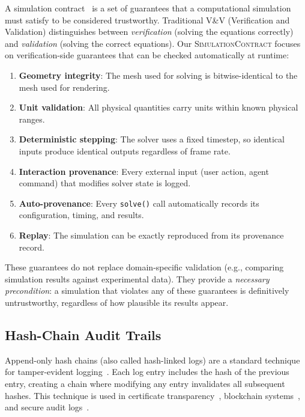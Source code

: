 \documentclass[letterpaper,twocolumn,10pt]{article}
\newcommand{\simcontract}{\textsc{SimulationContract}}
\begin{document}
A simulation contract~\cite{oberkampf2010verification,roache1998verification}
is a set of guarantees that a computational simulation must satisfy to be
considered trustworthy. Traditional V\&V (Verification and Validation)
distinguishes between \emph{verification} (solving the equations correctly)
and \emph{validation} (solving the correct equations). Our
\simcontract{} focuses on verification-side guarantees that can be
checked automatically at runtime:

\begin{enumerate}[leftmargin=*,topsep=2pt,itemsep=1pt]
  \item \textbf{Geometry integrity}: The mesh used for solving is
    bitwise-identical to the mesh used for rendering.
  \item \textbf{Unit validation}: All physical quantities carry units
    within known physical ranges.
  \item \textbf{Deterministic stepping}: The solver uses a fixed timestep,
    so identical inputs produce identical outputs regardless of frame rate.
  \item \textbf{Interaction provenance}: Every external input (user action,
    agent command) that modifies solver state is logged.
  \item \textbf{Auto-provenance}: Every \texttt{solve()} call automatically
    records its configuration, timing, and results.
  \item \textbf{Replay}: The simulation can be exactly reproduced from its
    provenance record.
\end{enumerate}

These guarantees do not replace domain-specific validation (e.g.,
comparing simulation results against experimental data). They provide
a \emph{necessary precondition}: a simulation that violates any of
these guarantees is definitively untrustworthy, regardless of how
plausible its results appear.

\subsection{Hash-Chain Audit Trails}

Append-only hash chains (also called hash-linked logs) are a standard
technique for tamper-evident logging~\cite{schneier1998cryptographic,
crosby2009efficient}. Each log entry includes the hash of the previous
entry, creating a chain where modifying any entry invalidates all
subsequent hashes. This technique is used in certificate
transparency~\cite{laurie2014certificate}, blockchain
systems~\cite{nakamoto2008bitcoin}, and secure audit
logs~\cite{holt2006logcrypt}.
\end{document}
